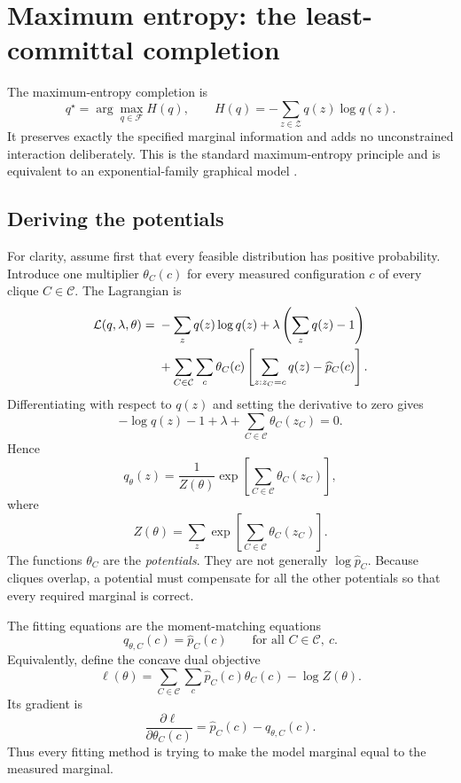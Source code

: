 \documentclass[11pt]{article}
\newcommand{\1}{\mathbf 1}
\newcommand{\mcC}{\mathcal C}
\newcommand{\mcZ}{\mathcal Z}
\newcommand{\hatp}{\widehat p}
\begin{document}
\section{Maximum entropy: the least-committal completion}

The maximum-entropy completion is
\begin{equation}
  q^\star
  =
  \arg\max_{q\in\mathcal F}
  H(q),
  \qquad
  H(q)=-\sum_{z\in\mcZ}q(z)\log q(z).
  \label{eq:maxent}
\end{equation}
It preserves exactly the specified marginal information and adds no
unconstrained interaction deliberately.  This is the standard maximum-entropy
principle and is equivalent to an exponential-family graphical model
\cite{wainwright_jordan}.

\subsection{Deriving the potentials}

For clarity, assume first that every feasible distribution has positive
probability.  Introduce one multiplier
\(\theta_C(c)\) for every measured configuration \(c\) of every clique
\(C\in\mcC\).  The Lagrangian is
\begin{align}
  \mathcal L(q,\lambda,\theta)
  ={}&
  -\sum_z q(z)\log q(z)
  +\lambda\left(\sum_z q(z)-1\right) \notag\\
  &+\sum_{C\in\mcC}\sum_c
  \theta_C(c)
  \left[
    \sum_{z:z_C=c}q(z)-\hatp_C(c)
  \right].
  \label{eq:lagrangian}
\end{align}
Differentiating with respect to \(q(z)\) and setting the derivative to zero
gives
\[
  -\log q(z)-1+\lambda+\sum_{C\in\mcC}\theta_C(z_C)=0.
\]
Hence
\begin{equation}
  q_\theta(z)
  =
  \frac{1}{Z(\theta)}
  \exp\left[
    \sum_{C\in\mcC}\theta_C(z_C)
  \right],
  \label{eq:factor_model}
\end{equation}
where
\[
  Z(\theta)
  =
  \sum_z
  \exp\left[
    \sum_{C\in\mcC}\theta_C(z_C)
  \right].
\]
The functions \(\theta_C\) are the \emph{potentials}.  They are not generally
\(\log\hatp_C\).  Because cliques overlap, a potential must compensate for all
the other potentials so that every required marginal is correct.

The fitting equations are the moment-matching equations
\begin{equation}
  q_{\theta,C}(c)
  =
  \hatp_C(c)
  \qquad
  \text{for all }C\in\mcC,\ c.
  \label{eq:moment_match}
\end{equation}
Equivalently, define the concave dual objective
\begin{equation}
  \ell(\theta)
  =
  \sum_{C\in\mcC}\sum_c
  \hatp_C(c)\theta_C(c)
  -
  \log Z(\theta).
  \label{eq:dual}
\end{equation}
Its gradient is
\begin{equation}
  \frac{\partial\ell}{\partial\theta_C(c)}
  =
  \hatp_C(c)-q_{\theta,C}(c).
  \label{eq:gradient}
\end{equation}
Thus every fitting method is trying to make the model marginal equal to the
measured marginal.
\end{document}
